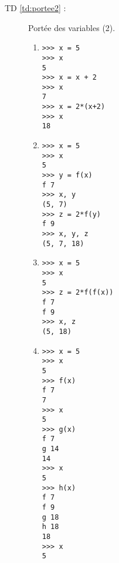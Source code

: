 \begin{description}
\begin{minipage}[t]{6cm}
\begin{enumerate}
\end{enumerate}
\end{minipage}

\item[TD \ref{td:portee2} :] Portée des variables (2).\\
\begin{minipage}[t]{6cm}
\begin{enumerate}
\item 

\begin{py}{6cm}
\begin{verbatim}
>>> x = 5
>>> x
5
>>> x = x + 2
>>> x
7
>>> x = 2*(x+2)
>>> x
18
\end{verbatim}
\end{py}
\end{enumerate}
\end{minipage}
\hfill
\begin{minipage}[t]{6cm}
\begin{enumerate}\setcounter{enumi}{1}
\item 

\begin{py}{6cm}
\begin{verbatim}
>>> x = 5
>>> x
5
>>> y = f(x)
f 7
>>> x, y
(5, 7)
>>> z = 2*f(y)
f 9
>>> x, y, z
(5, 7, 18)
\end{verbatim}
\end{py}
\end{enumerate}
\end{minipage}
\hfill
\begin{minipage}[t]{6cm}
\begin{enumerate}\setcounter{enumi}{2}
\item 

\begin{py}{6cm}
\begin{verbatim}
>>> x = 5
>>> x
5
>>> z = 2*f(f(x))
f 7
f 9
>>> x, z
(5, 18)
\end{verbatim}
\end{py}
\end{enumerate}
\end{minipage}


\begin{minipage}[t]{6cm}
\begin{enumerate}\setcounter{enumi}{3}
\item 

\begin{py}{6cm}
\begin{verbatim}
>>> x = 5
>>> x
5
>>> f(x)
f 7
7
>>> x
5
>>> g(x)
f 7
g 14
14
>>> x
5
>>> h(x)
f 7
f 9
g 18
h 18
18
>>> x
5
\end{verbatim}
\end{py}
\end{enumerate}
\end{minipage}
\end{description}

